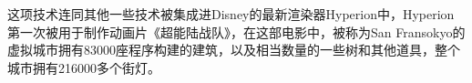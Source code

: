这项技术连同其他一些技术被集成进Disney的最新渲染器Hyperion中，Hyperion第一次被用于制作动画片《超能陆战队》，在这部电影中，被称为San Fransokyo的虚拟城市拥有83000座程序构建的建筑，以及相当数量的一些树和其他道具，整个城市拥有216000多个街灯。


